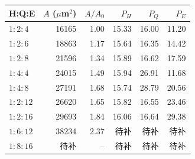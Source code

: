 \begin{tabular}{@{}lrrrrr@{}}\toprule
H:Q:E & $A$ ($\mu$m$^2$) & $A/A_0$ & $P_H$ & $P_Q$ & $P_E$ \\\midrule
$1:2:4$ & 16165 & 1.00 & 15.33 & 16.00 & 11.20 \\
$1:2:6$ & 18863 & 1.17 & 15.64 & 16.35 & 14.42 \\
$1:2:8$ & 21596 & 1.34 & 15.89 & 16.62 & 17.59 \\
$1:4:4$ & 24015 & 1.49 & 15.94 & 26.91 & 11.68 \\
$1:4:8$ & 27191 & 1.68 & 15.74 & 28.79 & 20.56 \\
$1:2:12$ & 26620 & 1.65 & 15.82 & 16.55 & 23.46 \\
$1:2:16$ & 29693 & 1.84 & 16.06 & 16.64 & 29.38 \\
$1:6:12$ & 38234 & 2.37 & 待补 & 待补 & 待补 \\
$1:8:16$ & 待补 & -- & 待补 & 待补 & 待补 \\
\bottomrule\end{tabular}
